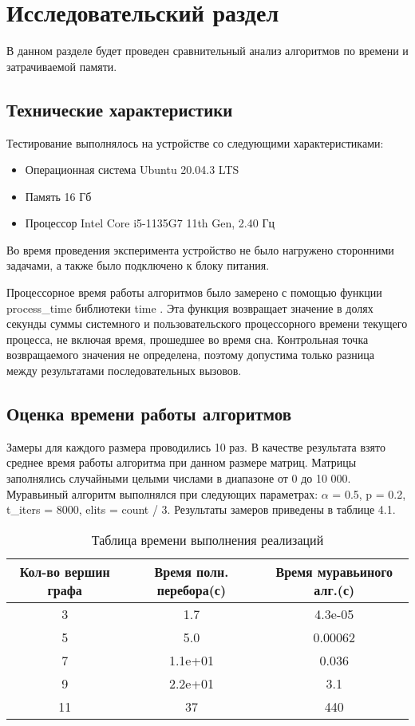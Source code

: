 \chapter{Исследовательский раздел}

В данном разделе будет проведен сравнительный анализ алгоритмов по
времени и затрачиваемой памяти.

\section{Технические характеристики}

Тестирование выполнялось на устройстве со следующими характеристиками: 

\begin{itemize}
	\item Операционная система Ubuntu 20.04.3 LTS \cite{ubuntu}
	\item Память 16 Гб
	\item Процессор Intel Core i5-1135G7 11th Gen, 2.40 Гц \cite{intel}
\end{itemize}

Во время проведения эксперимента устройство не было нагружено сторонними задачами, а также было подключено к блоку питания.

Процессорное время работы алгоритмов было замерено с помощью функции process\_time
библиотеки time . Эта функция возвращает значение в долях секунды суммы системного и
пользовательского процессорного времени текущего процесса, не включая время, прошедшее
во время сна. Контрольная точка возвращаемого значения не определена, поэтому допустима
только разница между результатами последовательных вызовов. \cite{time}

\section{Оценка времени работы алгоритмов}

Замеры для каждого размера проводились 10 раз. В качестве результата взято среднее
время работы алгоритма при данном размере матриц. Матрицы заполнялись случайными
целыми числами в диапазоне от 0 до 10 000. Муравьиный алгоритм выполнялся при следующих параметрах: $\alpha$ = 0.5, p = 0.2, t\_iters = 8000, elits = count / 3.
Результаты замеров приведены в таблице 4.1.

\begin{table} [H]
	\caption{Таблица времени выполнения реализаций}
	\begin{center}
		\begin{tabular}{|c c c|} 
			\hline
			Кол-во вершин графа & Время полн. перебора(с) & Время муравьиного алг.(с)\\  
			\hline
			3 & 1.7 & 4.3e-05\\
			\hline
			5 & 5.0  & 0.00062\\
			\hline
			7 & 1.1e+01 & 0.036 \\
			\hline
			9 & 2.2e+01 & 3.1  \\
			\hline
			11 & 37 & 440\\
			\hline
		\end{tabular}
	\end{center}
	\label{tab:time}
\end{table}

